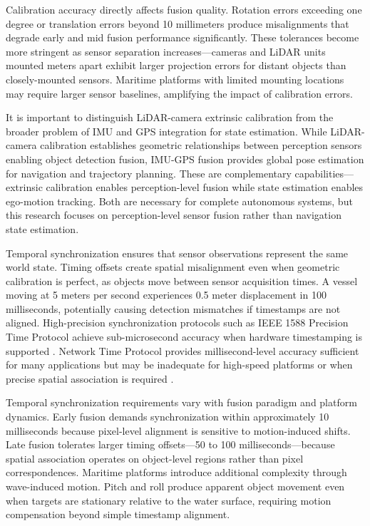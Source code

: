 \documentclass[../main.tex]{subfiles}
\begin{document}
Calibration accuracy directly affects fusion quality. Rotation errors exceeding one degree or translation errors beyond 10 millimeters produce misalignments that degrade early and mid fusion performance significantly. These tolerances become more stringent as sensor separation increases—cameras and LiDAR units mounted meters apart exhibit larger projection errors for distant objects than closely-mounted sensors. Maritime platforms with limited mounting locations may require larger sensor baselines, amplifying the impact of calibration errors.

It is important to distinguish LiDAR-camera extrinsic calibration from the broader problem of IMU and GPS integration for state estimation. While LiDAR-camera calibration establishes geometric relationships between perception sensors enabling object detection fusion, IMU-GPS fusion provides global pose estimation for navigation and trajectory planning. These are complementary capabilities—extrinsic calibration enables perception-level fusion while state estimation enables ego-motion tracking. Both are necessary for complete autonomous systems, but this research focuses on perception-level sensor fusion rather than navigation state estimation.

Temporal synchronization ensures that sensor observations represent the same world state. Timing offsets create spatial misalignment even when geometric calibration is perfect, as objects move between sensor acquisition times. A vessel moving at 5 meters per second experiences 0.5 meter displacement in 100 milliseconds, potentially causing detection mismatches if timestamps are not aligned. High-precision synchronization protocols such as IEEE 1588 Precision Time Protocol achieve sub-microsecond accuracy when hardware timestamping is supported \cite{NULTMV4V}. Network Time Protocol provides millisecond-level accuracy sufficient for many applications but may be inadequate for high-speed platforms or when precise spatial association is required \cite{furgale2013, liu2021}.

Temporal synchronization requirements vary with fusion paradigm and platform dynamics. Early fusion demands synchronization within approximately 10 milliseconds because pixel-level alignment is sensitive to motion-induced shifts. Late fusion tolerates larger timing offsets—50 to 100 milliseconds—because spatial association operates on object-level regions rather than pixel correspondences. Maritime platforms introduce additional complexity through wave-induced motion. Pitch and roll produce apparent object movement even when targets are stationary relative to the water surface, requiring motion compensation beyond simple timestamp alignment.
\end{document}
